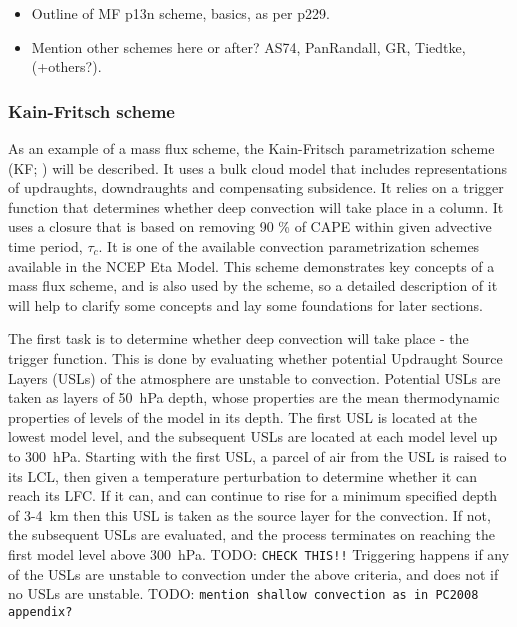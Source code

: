 \documentclass[11pt,a4paper]{article}
\newcommand{\todo}{TODO: \texttt}
\begin{document}
\begin{itemize}
    \item Outline of MF p13n scheme, basics, as per \cite{stensrud2009parameterization} p229.
    \item Mention other schemes here or after? AS74, PanRandall, GR, Tiedtke, (+others?).
\end{itemize}


\subsubsection{Kain-Fritsch scheme}
As an example of a mass flux scheme, the Kain-Fritsch parametrization scheme (KF; \cite{kain1990one, kain1993convective, kain2003parameterized}) will be described. It uses a bulk cloud model that includes representations of updraughts, downdraughts and compensating subsidence. It relies on a trigger function that determines whether deep convection will take place in a column. It uses a closure that is based on removing 90 \% of CAPE within given advective time period, $\tau_c$. It is one of the available convection parametrization schemes available in the NCEP Eta Model. This scheme demonstrates key concepts of a mass flux scheme, and is also used by the \cite{plant2008stochastic} scheme, so a detailed description of it will help to clarify some concepts and lay some foundations for later sections.

The first task is to determine whether deep convection will take place - the trigger function. This is done by evaluating whether potential Updraught Source Layers (USLs) of the atmosphere are unstable to convection. Potential USLs are taken as layers of \SI{50}{hPa} depth, whose properties are the mean thermodynamic properties of levels of the model in its depth. The first USL is located at the lowest model level, and the subsequent USLs are located at each model level up to \SI{300}{hPa}. Starting with the first USL, a parcel of air from the USL is raised to its LCL, then given a temperature perturbation to determine whether it can reach its LFC. If it can, and can continue to rise for a minimum specified depth of \SI{3}{}-\SI{4}{km} then this USL is taken as the source layer for the convection. If not, the subsequent USLs are evaluated, and the process terminates on reaching the first model level above \SI{300}{hPa}. \todo{CHECK THIS!!} Triggering happens if any of the USLs are unstable to convection under the above criteria, and does not if no USLs are unstable. \todo{mention shallow convection as in PC2008 appendix?}
\end{document}

